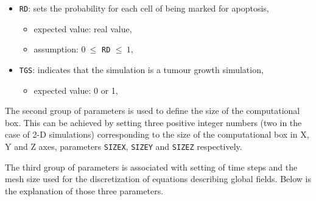 \documentclass[10pt]{article}
\begin{document}
\begin{itemize}
\item {\tt RD}: sets the probability for each cell of being marked for apoptosis,
\begin{itemize}
\item expected value: real value,
\item assumption: $0\ \le$ {\tt RD} $\le\ 1$,
\end{itemize}

\item {\tt TGS}: indicates that the simulation is a tumour growth simulation,
\begin{itemize}
\item expected value: 0 or 1,
\end{itemize}

\end{itemize}

\indent The second group of parameters is used to define the size of the computational box. This can be achieved by setting three positive integer numbers (two in the case of 2-D simulations) corresponding to the size of the computational box in X, Y and Z axes, parameters {\tt SIZEX}, {\tt SIZEY} and {\tt SIZEZ} respectively.

\indent The third group of parameters is associated with setting of time steps and the mesh size used for the discretization of equations describing global fields. Below is the explanation of those three parameters.
\end{document}

